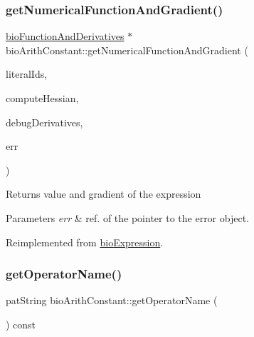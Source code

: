 \mbox{\label{classbio_arith_constant_a42bfbc2f6dfc86d5530fee64146b2172}} 
\subsubsection{\texorpdfstring{get\+Numerical\+Function\+And\+Gradient()}{getNumericalFunctionAndGradient()}}
{\footnotesize\ttfamily \hyperlink{classbio_function_and_derivatives}{bio\+Function\+And\+Derivatives} $\ast$ bio\+Arith\+Constant\+::get\+Numerical\+Function\+And\+Gradient (\begin{DoxyParamCaption}\item[{vector$<$ pat\+U\+Long $>$}]{literal\+Ids,  }\item[{pat\+Boolean}]{compute\+Hessian,  }\item[{pat\+Boolean}]{debug\+Derivatives,  }\item[{pat\+Error $\ast$\&}]{err }\end{DoxyParamCaption})\hspace{0.3cm}{\ttfamily [virtual]}}

\begin{DoxyReturn}{Returns}
value and gradient of the expression 
\end{DoxyReturn}

\begin{DoxyParams}{Parameters}
{\em err} & ref. of the pointer to the error object. \\
\hline
\end{DoxyParams}


Reimplemented from \hyperlink{classbio_expression_a91c81ce80c9e972c913b10f5f3c1ed13}{bio\+Expression}.

\mbox{\label{classbio_arith_constant_a13a6799f54ffbbc8b43d54b213888fe0}} 
\subsubsection{\texorpdfstring{get\+Operator\+Name()}{getOperatorName()}}
{\footnotesize\ttfamily pat\+String bio\+Arith\+Constant\+::get\+Operator\+Name (\begin{DoxyParamCaption}{ }\end{DoxyParamCaption}) const\hspace{0.3cm}{\ttfamily [virtual]}}

